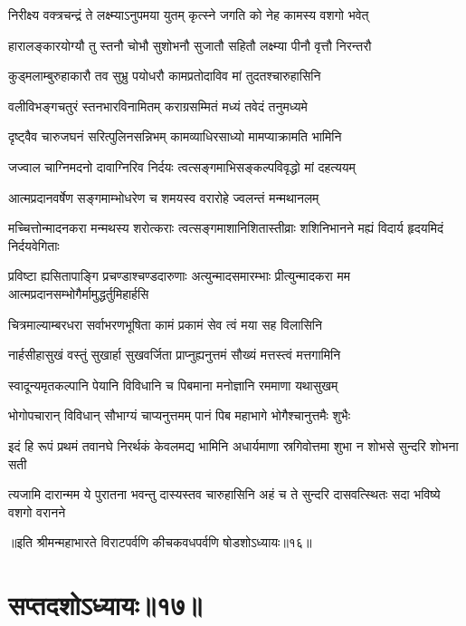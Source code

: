\twolineshloka
{निरीक्ष्य वक्त्रचन्द्रं ते लक्ष्म्याऽनुपमया युतम्}
{कृत्स्ने जगति को नेह कामस्य वशगो भवेत्}


\twolineshloka
{हारालङ्कारयोग्यौ तु स्तनौ चोभौ सुशोभनौ}
{सुजातौ सहितौ लक्ष्म्या पीनौ वृत्तौ निरन्तरौ}


\twolineshloka
{कुड्मलाम्बुरुहाकारौ तव सुभ्रु पयोधरौ}
{कामप्रतोदाविव मां तुदतश्चारुहासिनि}


\twolineshloka
{वलीविभङ्गचतुरं स्तनभारविनामितम्}
{कराग्रसम्मितं मध्यं तवेदं तनुमध्यमे}


\twolineshloka
{दृष्ट्वैव चारुजघनं सरित्पुलिनसन्निभम्}
{कामव्याधिरसाध्यो मामप्याक्रामति भामिनि}


\twolineshloka
{जज्वाल चाग्निमदनो दावाग्निरिव निर्दयः}
{त्वत्सङ्गमाभिसङ्कल्पविवृद्धो मां दहत्ययम्}


\twolineshloka
{आत्मप्रदानवर्षेण सङ्गमाम्भोधरेण च}
{शमयस्व वरारोहे ज्वलन्तं मन्मथानलम्}


\threelineshloka
{मच्चित्तोन्मादनकरा मन्मथस्य शरोत्कराः}
{त्वत्सङ्गमाशानिशितास्तीव्राः शशिनिभानने}
{मह्यं विदार्य हृदयमिदं निर्दयवेगिताः}


\threelineshloka
{प्रविष्टा ह्यसितापाङ्गि प्रचण्डाश्चण्डदारुणाः}
{अत्युन्मादसमारम्भाः प्रीत्युन्मादकरा मम}
{आत्मप्रदानसम्भोगैर्मामुद्धर्तुमिहार्हसि}


\twolineshloka
{चित्रमाल्याम्बरधरा सर्वाभरणभूषिता}
{कामं प्रकामं सेव त्वं मया सह विलासिनि}


\twolineshloka
{नार्हसीहासुखं वस्तुं सुखार्हा सुखवर्जिता}
{प्राप्नुह्यनुत्तमं सौख्यं मत्तस्त्वं मत्तगामिनि}


\twolineshloka
{स्वादून्यमृतकल्पानि पेयानि विविधानि च}
{पिबमाना मनोज्ञानि रममाणा यथासुखम्}


\twolineshloka
{भोगोपचारान् विविधान् सौभाग्यं चाप्यनुत्तमम्}
{पानं पिब महाभागे भोगैश्चानुत्तमैः शुभैः}


\fourlineindentedshloka
{इदं हि रूपं प्रथमं तवानघे}
{निरर्थकं केवलमद्य भामिनि}
{अधार्यमाणा स्रगिवोत्तमा शुभा}
{न शोभसे सुन्दरि शोभना सती}


\fourlineindentedshloka
{त्यजामि दारान्मम ये पुरातना}
{भवन्तु दास्यस्तव चारुहासिनि}
{अहं च ते सुन्दरि दासवत्स्थितः}
{सदा भविष्ये वशगो वरानने}

॥इति श्रीमन्महाभारते विराटपर्वणि कीचकवधपर्वणि षोडशोऽध्यायः॥१६॥

\chapter{सप्तदशोऽध्यायः॥१७॥}

